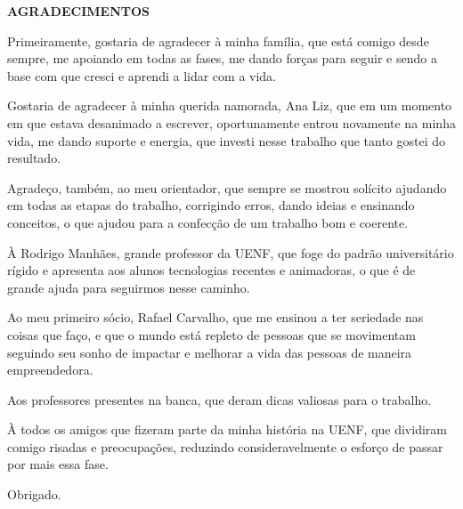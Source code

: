 \begin{center}
\textbf{AGRADECIMENTOS} \\ [2.5cm]
\end{center}

Primeiramente, gostaria de agradecer à minha família, que está comigo desde sempre, me apoiando em todas as fases, me dando forças para seguir e sendo a base com que cresci e aprendi a lidar com a vida.

Gostaria de agradecer à minha querida namorada, Ana Liz, que em um momento em que estava desanimado a escrever, oportunamente entrou novamente na minha vida, me dando suporte e energia, que investi nesse trabalho que tanto gostei do resultado.

Agradeço, também, ao meu orientador, que sempre se mostrou solícito ajudando em todas as etapas do trabalho, corrigindo erros, dando ideias e ensinando conceitos, o que ajudou para a confecção de um trabalho bom e coerente.

À Rodrigo Manhães, grande professor da UENF, que foge do padrão universitário rígido e apresenta aos alunos tecnologias recentes e animadoras, o que é de grande ajuda para seguirmos nesse caminho.

Ao meu primeiro sócio, Rafael Carvalho, que me ensinou a ter seriedade nas coisas que faço, e que o mundo está repleto de pessoas que se movimentam seguindo seu sonho de impactar e melhorar a vida das pessoas de maneira empreendedora.

Aos professores presentes na banca, que deram dicas valiosas para o trabalho.

À todos os amigos que fizeram parte da minha história na UENF, que dividiram comigo risadas e preocupações, reduzindo consideravelmente o esforço de passar por mais essa fase.

Obrigado.




